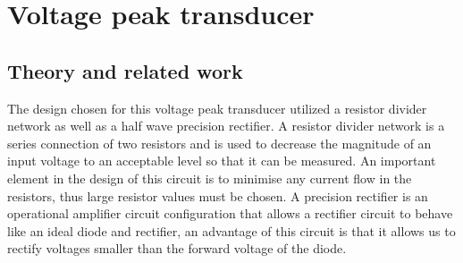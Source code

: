 \chapter{Voltage peak transducer}
\section{Theory and related work} \label{sec:literature_voltage_peak_transducer}
The design chosen for this voltage peak transducer utilized a resistor divider network as well as a half wave precision rectifier. A resistor divider network is a series connection of two resistors and is used to decrease the magnitude of an input voltage to an acceptable level so that it can be measured. An important element in the design of this circuit is to minimise any current flow in the resistors, thus large resistor values must be chosen. A precision rectifier is an operational amplifier circuit configuration that allows a rectifier circuit to behave like an ideal diode and rectifier, an advantage of this circuit is that it allows us to rectify voltages smaller than the forward voltage of the diode.

